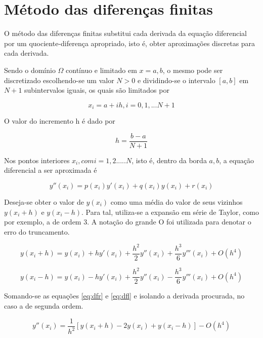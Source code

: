 \section{Método das diferenças finitas}

O método das diferenças finitas substitui cada derivada da equação diferencial por um quociente-diferença apropriado,
\citep[p. 684]{burden_faires}
isto é, obter aproximações discretas para cada derivada.

Sendo o domínio $ \Omega $ contínuo e limitado em $ x = {a, b} $, o mesmo pode ser discretizado escolhendo-se um valor $ N > 0 $ e dividindo-se o intervalo $ [a, b] $ em $ N + 1 $ subintervalos iguais, os quais são limitados por

\begin{equation}
  x_i = a + ih,  i = 0, 1, ... N+1
\end{equation}

O valor do incremento h é dado por 

\begin{equation}
  h = \frac{b-a}{N+1}
\end{equation}

Nos pontos interiores $ x_i , com i = 1, 2. .... N $, isto é, dentro da borda $ {a, b} $, a equação diferencial a ser aproximada é

\begin{equation}
    \label{eq:edo2}
    y''(x_i) = p(x_i)y'(x_i) + q(x_i)y(x_i) + r(x_i)
\end{equation}

Deseja-se obter o valor de $ y(x_i) $ como uma média do valor de seus vizinhos $ y(x_i + h) $ e $ y(x_i - h) $. Para tal, utiliza-se a expansão em série de Taylor, como por exemplo, a de ordem 3. A notação do grande O foi utilizada para denotar o erro do truncamento.

\begin{equation}
    \label{eq:dfr}
    y(x_i + h) = y(x_i) + hy'(x_i) + \frac{h^{2}}{2}y''(x_i) + \frac{h^{3}}{6}y'''(x_i) + O(h^{4})
\end{equation}

\begin{equation}
    \label{eq:dfl}
    y(x_i - h) = y(x_i) - hy'(x_i) + \frac{h^{2}}{2}y''(x_i) - \frac{h^{3}}{6}y'''(x_i) + O(h^{4})
\end{equation}

Somando-se as equações \ref{eq:dfr} e \ref{eq:dfl} e isolando a derivada procurada, no caso a de segunda ordem.

\begin{equation}
    \label{eq:difcent2}
    y''(x_i) = \frac{1}{h^2}[y(x_i + h) - 2y(x_i) +y(x_i - h)] - O(h^{4})
\end{equation}

